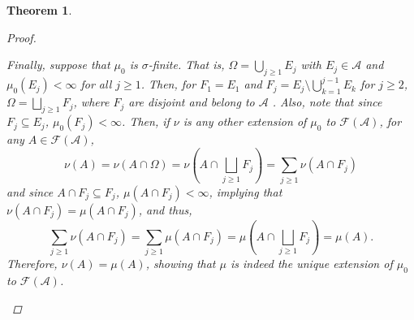 \documentclass{article}
\newcommand{\A}{\mathscr{A}}
\newcommand{\F}{\mathscr{F}}
\theoremstyle{spaced}
\newtheorem{theorem}{Theorem}[section]
\begin{document}
\begin{theorem}
\begin{proof}
\begin{enumerate}
            Finally, suppose that $\mu_0$ is $\sigma$-finite. That is, $\Omega = \bigcup_{j \geq 1} E_j$ with $E_j \in \A$ and $\mu_0(E_j) < \infty$ for all $j \geq 1$. Then, for $F_1 = E_1$ and $F_j = E_j \setminus \bigcup_{k = 1}^{j - 1} E_k$ for $j \geq 2$, $\Omega = \bigsqcup_{j \geq 1} F_j$, where $F_j$ are disjoint and belong to $\A$ . Also, note that since $F_j \subseteq E_j$, $\mu_0(F_j) < \infty$. Then, if $\nu$ is any other extension of $\mu_0$ to $\F(\A)$, for any $A \in \F(\A)$,
            \begin{equation*}
                \nu(A) = \nu\left( A \cap \Omega\right) = \nu\left( A \cap \bigsqcup_{j \geq 1} F_j\right) = \sum_{j \ge 1} \nu(A \cap F_j) 
            \end{equation*}
            and since $A \cap F_j \subseteq F_j$, $\mu(A \cap F_j) < \infty$, implying that $\nu(A \cap F_j) = \mu(A \cap F_j)$, and thus,
            \begin{equation*}
                \sum_{j \ge 1} \nu(A \cap F_j) = \sum_{j \ge 1} \mu(A \cap F_j) =  \mu\left( A \cap \bigsqcup_{j \geq 1} F_j\right) = \mu(A).
            \end{equation*}
            Therefore, $\nu(A) = \mu(A)$, showing that $\mu$ is indeed the unique extension of $\mu_0$ to $\F(\A)$.
        \end{enumerate}
    \end{proof}
\end{theorem}
\end{document}

